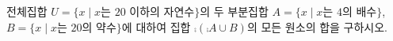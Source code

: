 전체집합 $U=\{x \mid x$는 $20$ 이하의 자연수$\}$의 두 부분집합 $A=\{x \mid x$는 $4$의 배수$\}$, $B=\{x \mid x$는 $20$의 약수$\}$에 대하여 집합 $\comp{(\comp{A}\cup B)}$의 모든 원소의 합을 구하시오.
